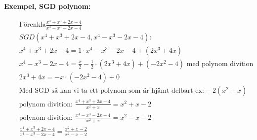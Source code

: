 \newpage
\textbf{Exempel, SGD polynom:}\par
\begin{align*}
  &\quad  \text{Förenkla} \frac{x^4+x^3+2x-4}{x^4-x^3-2x-4} \\
  &\quad  SGD(x^4+x^3+2x-4, x^4-x^3-2x-4):  \\
  &\quad  x^4+x^3+2x-4 = 1 \cdot x^4-x^3-2x-4 + (2x^3 +4x) \\
  &\quad  x^4-x^3-2x-4 = \frac{x}{2}-\frac{1}{2} \cdot (2x^3 +4x) + (-2x^2-4) \text{ med polynom divition} \\
  &\quad      2x^3 +4x = -x \cdot (-2x^2-4) +0 \\
  &\quad  \text{Med SGD så kan vi ta ett polynom som är hjämt delbart ex:} -2(x^2+x) \\
  &\quad  \text{polynom divition: } \frac{x^4+x^3+2x-4}{x^2+x} = x^2+x-2 \\
  &\quad  \text{polynom divition: } \frac{x^4-x^3-2x-4}{x^2+x} = x^2-x-2 \\
  &\quad  \frac{x^4+x^3+2x-4}{x^4-x^3-2x-4} = \frac{x^2+x-2}{x^2-x-2} \\  
\end{align*}
